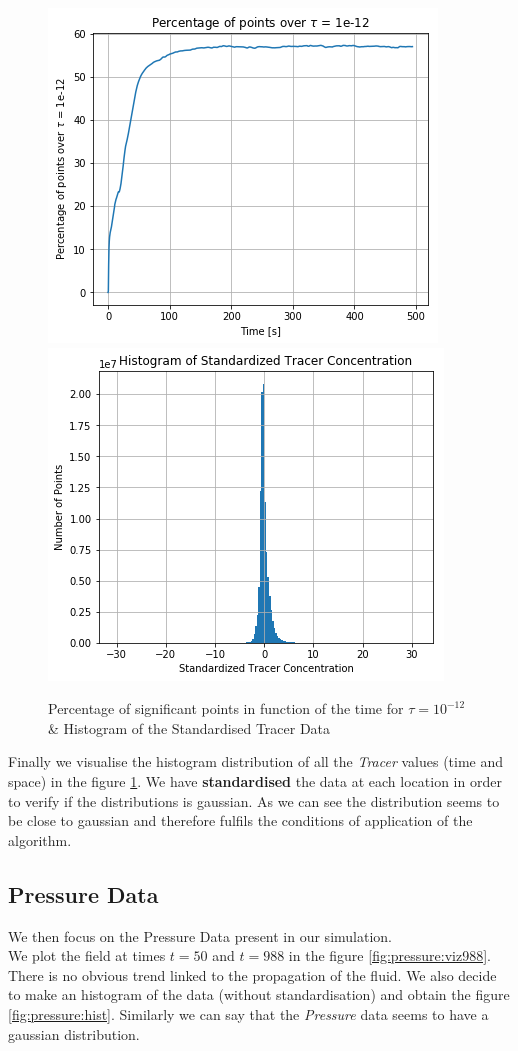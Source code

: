 \begin{figure}[h]
\centering
	\includegraphics[width = 0.45 \textwidth]{figures/DataAnalysis/SumDataTime}
	~
	\includegraphics[width = 0.45 \textwidth]{figures/DataAnalysis/HistoGramTracerSTD}
	\caption{Percentage of significant points in function of the time for $\tau = 10^{-12}$ \& Histogram of the Standardised Tracer Data}
	\label{fig:sumtime}
\end{figure}

Finally we visualise the histogram distribution of all the \textit{Tracer} values (time and space) in the figure \ref{fig:sumtime}. We have \textbf{standardised} the data at each location in order to verify if the distributions is gaussian. As we can see the distribution seems to be close to gaussian and therefore fulfils the conditions of application of the algorithm. 

\subsection{Pressure Data}

We then focus on the Pressure Data present in our simulation. \\ 

We plot the field at times $t=50 $ and $t= 988$ in the figure \ref{fig:pressure:viz988}. There is no obvious trend linked to the propagation of the fluid. We also decide to make an histogram of the data (without standardisation) and obtain the figure \ref{fig:pressure:hist}. Similarly we can say that the \textit{Pressure} data seems to have a gaussian distribution. 


